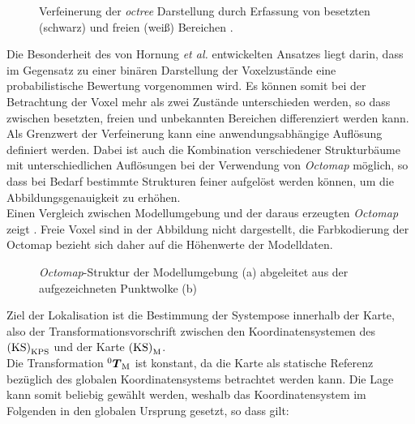 \begin{figure}[!ht]
	\begin{center}
	\hspace{5mm}
	\caption{Verfeinerung der \textit{octree} Darstellung durch Erfassung von besetzten (schwarz) und freien (weiß) Bereichen \cite{Hornung2013}. }
	\label{fig.octree}
	\end{center}
\end{figure}

Die Besonderheit des von Hornung \textit{et al.} entwickelten Ansatzes liegt darin, dass im Gegensatz zu einer binären Darstellung der Voxelzustände eine probabilistische Bewertung vorgenommen wird. Es können somit bei der Betrachtung der Voxel mehr als zwei Zustände unterschieden werden, so dass zwischen besetzten, freien und unbekannten Bereichen differenziert werden kann. Als Grenzwert der Verfeinerung kann eine anwendungsabhängige Auflösung definiert werden. Dabei ist auch die Kombination verschiedener Strukturbäume mit unterschiedlichen Auflösungen bei der Verwendung von \textit{Octomap} möglich, so dass bei Bedarf bestimmte Strukturen feiner aufgelöst werden können, um die Abbildungsgenauigkeit zu erhöhen.\\
Einen Vergleich zwischen Modellumgebung und der daraus erzeugten \textit{Octomap} zeigt . Freie Voxel sind in der Abbildung nicht dargestellt, die Farbkodierung der Octomap bezieht sich daher auf die Höhenwerte der Modelldaten.\\

\begin{figure}[!ht]
	\begin{center}
	\hspace{5mm}
	\caption{\textit{Octomap}-Struktur der Modellumgebung (a) abgeleitet aus der aufgezeichneten Punktwolke (b)}
	\label{fig.octomap}
	\end{center}
\end{figure}%

Ziel der Lokalisation ist die Bestimmung der Systempose innerhalb der Karte, also der Transformationsvorschrift zwischen den Koordinatensystemen des  ${\mathrm{(KS)}}_{\mathrm{KPS}}$ und der Karte ${\mathrm{(KS)}}_{\mathrm{M}}$.\\
Die Transformation ${^{\mathrm{0}}\mbox{\boldmath{$T$}}_{\mathrm{M}}}$ ist konstant, da die Karte als statische Referenz bezüglich des globalen Koordinatensystems betrachtet werden kann. Die Lage kann somit beliebig gewählt werden, weshalb das Koordinatensystem im Folgenden in den globalen Ursprung gesetzt, so dass gilt:

